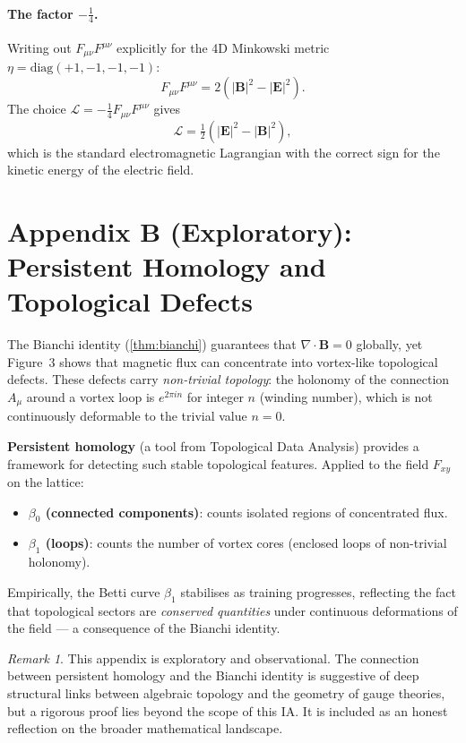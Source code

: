 \documentclass[12pt, a4paper]{article}
\theoremstyle{plain}
\theoremstyle{definition}
\theoremstyle{remark}
\newtheorem{remark}[theorem]{Remark}
\newcommand{\Lag}{\mathcal{L}}
\begin{document}
\paragraph{The factor $-\frac{1}{4}$.}
Writing out $F_{\mu\nu}F^{\mu\nu}$ explicitly for the 4D Minkowski metric $\eta = \mathrm{diag}(+1,-1,-1,-1)$:
\[
  F_{\mu\nu}F^{\mu\nu} = 2(|\mathbf{B}|^2 - |\mathbf{E}|^2).
\]
The choice $\Lag = -\tfrac{1}{4}F_{\mu\nu}F^{\mu\nu}$ gives
\[
  \Lag = \tfrac{1}{2}(|\mathbf{E}|^2 - |\mathbf{B}|^2),
\]
which is the standard electromagnetic Lagrangian with the correct sign for the kinetic energy of the electric field.

\section{Appendix B (Exploratory): Persistent Homology and Topological Defects}
\label{app:B}

The Bianchi identity (\cref{thm:bianchi}) guarantees that $\nabla\cdot\mathbf{B}=0$ globally, yet Figure~3 shows that magnetic flux can concentrate into vortex-like topological defects.  These defects carry \emph{non-trivial topology}: the holonomy of the connection $A_\mu$ around a vortex loop is $e^{2\pi i n}$ for integer $n$ (winding number), which is not continuously deformable to the trivial value $n=0$.

\textbf{Persistent homology} (a tool from Topological Data Analysis) provides a framework for detecting such stable topological features.  Applied to the field $F_{xy}$ on the lattice:

\begin{itemize}
  \item \textbf{$\beta_0$ (connected components)}: counts isolated regions of concentrated flux.
  \item \textbf{$\beta_1$ (loops)}: counts the number of vortex cores (enclosed loops of non-trivial holonomy).
\end{itemize}

Empirically, the Betti curve $\beta_1$ stabilises as training progresses, reflecting the fact that topological sectors are \emph{conserved quantities} under continuous deformations of the field — a consequence of the Bianchi identity.

\begin{remark}
This appendix is exploratory and observational.  The connection between persistent homology and the Bianchi identity is suggestive of deep structural links between algebraic topology and the geometry of gauge theories, but a rigorous proof lies beyond the scope of this IA.  It is included as an honest reflection on the broader mathematical landscape.
\end{remark}
\end{document}
